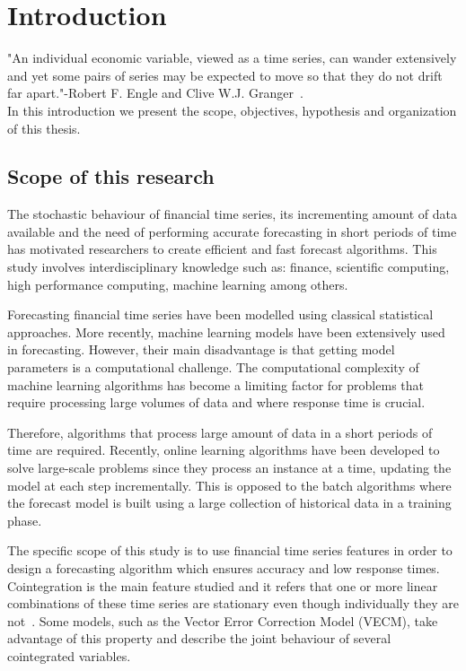 \chapter{Introduction}\label{ch:introduction}

\vspace{0.5cm} 

"An individual economic variable, viewed as a time series, can wander extensively
and yet some pairs of series may be expected to move so that they do not drift
far apart."-Robert F. Engle and Clive W.J. Granger~\cite{engle1987}.\\
In this introduction we present the scope, objectives, hypothesis and
organization of this thesis.


\section{Scope of this research}

The stochastic behaviour of financial time series, its incrementing
amount of data available and the need of performing accurate forecasting in
short periods of time has motivated researchers to create efficient and fast forecast
algorithms. This study involves interdisciplinary knowledge such as: finance,
scientific computing, high performance computing, machine learning
among others.

Forecasting financial time series have been modelled using classical statistical
approaches. More recently, machine learning models have been extensively used in
forecasting. However, their main disadvantage is that getting model parameters
is a computational challenge.  The computational complexity of machine learning
algorithms has become a limiting factor for problems that require processing
large volumes of data and where response time is crucial.

Therefore, algorithms that process large amount of data in a short periods of
time are required. Recently, online learning algorithms have been developed to solve
large-scale problems since they process an instance at a time, updating the
model at each step incrementally. This is opposed to the batch algorithms where
the forecast model is built using a large collection of historical data in
a training phase.

The specific scope of this study is to use financial time series features in
order to design a forecasting algorithm which ensures accuracy and low response
times. Cointegration is the main feature studied and it refers that one or more
linear combinations of these time series are stationary even though individually
they are not~\cite{engle87}.  Some models, such as the Vector Error Correction Model
(VECM), take advantage of this property and describe the joint behaviour of
several cointegrated variables.

